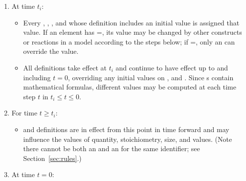 \begin{enumerate}

\item At time $t_i$:
  \begin{itemize}
    
  \item Every \Species, \SpeciesReference, \Compartment, and \Parameter whose
    definition includes an initial value is assigned that value.
    If an element has =, its
    value may be changed by other constructs or reactions in a
    model according to the steps below; if
    =, only an \InitialAssignment can
    override the value.
    
  \item All \InitialAssignment definitions take effect at $t_i$
    and continue to have effect up to and including $t = 0$,
    overriding any initial values on \Species, \Compartment and
    \Parameter.  Since \InitialAssignment{}s contain mathematical
    formulas, different values may be computed at each time step
    $t$ in $t_i \leq t \leq 0$.


  \end{itemize}
  
\item For time $t \geq t_i$:
  \begin{itemize}
    
  \item \AssignmentRule and \AlgebraicRule definitions are in
    effect from this point in time forward and may influence the
    values of \Species quantity, \SpeciesReference stoichiometry,
    \Compartment size, and \Parameter
    values.  (Note there cannot be both an \AssignmentRule and an
    \InitialAssignment for the same identifier; see
    Section~\ref{sec:rules}.)

  \end{itemize}
  
\item At time $t = 0$:
  \begin{itemize}  
    

\end{itemize}
\end{enumerate}
